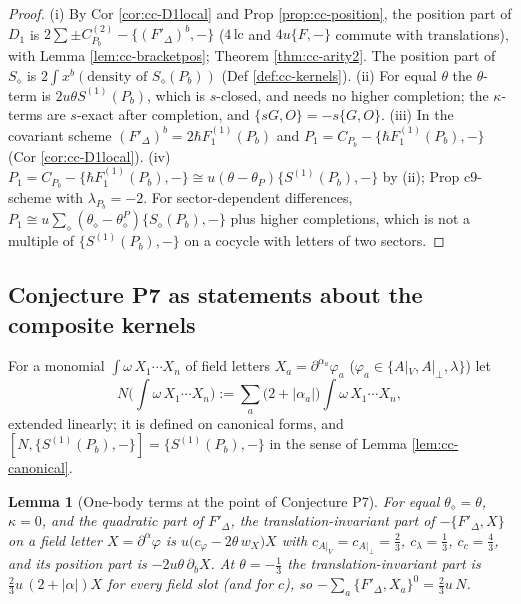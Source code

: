 \documentclass[11pt]{article}
\numberwithin{equation}{section}
\theoremstyle{plain}
\newtheorem{lemma}[theorem]{Lemma}
\theoremstyle{definition}
\newcommand{\Ap}{A|_{\perp}}
\newcommand{\AV}{A|_V}
\begin{document}
\begin{proof}
(i) By Cor \ref{cor:cc-D1local} and Prop \ref{prop:cc-position}, the position part of $D_1$ is $2\sum\pm C^{(2)}_{P_b}-\{(F'_\Delta)^b,-\}$ ($4\,\mathrm{lc}$ and $4u\{F,-\}$ commute with translations), with Lemma \ref{lem:cc-bracketpos}; Theorem \ref{thm:cc-arity2}. The position part of $S_\diamond$ is $2\int x^b(\text{density of }S_\diamond(P_b))$ (Def \ref{def:cc-kernels}). (ii) For equal $\theta$ the $\theta$-term is $2u\theta S^{(1)}(P_b)$, which is $s$-closed, and needs no higher completion; the $\kappa$-terms are $s$-exact after completion, and $\{sG,O\}=-s\{G,O\}$. (iii) In the covariant scheme $(F'_\Delta)^b=2\hbar F_1^{(1)}(P_b)$ and $P_1=C_{P_b}-\{\hbar F_1^{(1)}(P_b),-\}$ (Cor \ref{cor:cc-D1local}). (iv) $P_1=C_{P_b}-\{\hbar F_1^{(1)}(P_b),-\}\cong u(\theta-\theta_P)\{S^{(1)}(P_b),-\}$ by (ii); Prop c9-scheme with $\lambda_{P_b}=-2$. For sector-dependent differences, $P_1\cong u\sum_\diamond(\theta_\diamond-\theta^P_\diamond)\{S_\diamond(P_b),-\}$ plus higher completions, which is not a multiple of $\{S^{(1)}(P_b),-\}$ on a cocycle with letters of two sectors.
\end{proof}

\subsection{Conjecture P7 as statements about the composite kernels}

For a monomial $\int\omega\,X_1\cdots X_n$ of field letters $X_a=\partial^{\alpha_a}\varphi_a$ ($\varphi_a\in\{\AV,\Ap,\lambda\}$) let
\[
N\Big(\int\omega\,X_1\cdots X_n\Big):=\sum_a\big(2+|\alpha_a|\big)\int\omega\,X_1\cdots X_n,
\]
extended linearly; it is defined on canonical forms, and $[N,\{S^{(1)}(P_b),-\}]=\{S^{(1)}(P_b),-\}$ in the sense of Lemma \ref{lem:cc-canonical}.

\begin{lemma}[One-body terms at the point of Conjecture P7]
\label{lem:cc-onebody}
For equal $\theta_\diamond=\theta$, $\kappa=0$, and the quadratic part of $F'_\Delta$, the translation-invariant part of $-\{F'_\Delta,X\}$ on a field letter $X=\partial^\alpha\varphi$ is $u\big(c_\varphi-2\theta\,w_X\big)X$ with $c_{\AV}=c_{\Ap}=\tfrac23$, $c_\lambda=\tfrac13$, $c_c=\tfrac43$, and its position part is $-2u\theta\,\partial_bX$. At $\theta=-\tfrac13$ the translation-invariant part is $\tfrac23u\,(2+|\alpha|)X$ for every field slot (and for $c$), so $-\sum_a\{F'_\Delta,X_a\}^0=\tfrac23u\,N$.
\end{lemma}
\end{document}
